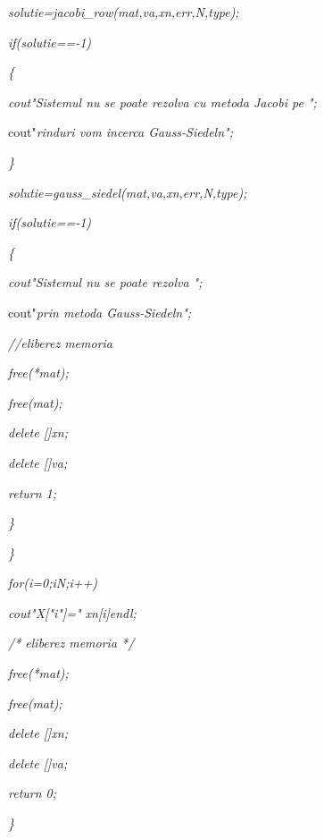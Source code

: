 \documentclass[a4paper,twoside]{book}
\begin{document}
\textit{\qquad \qquad solutie=jacobi\_row(mat,va,xn,err,N,type);}

\textit{\qquad \qquad if(solutie==-1)}

\textit{\qquad \qquad \{}

\textit{\qquad \qquad \qquad cout\TEXTsymbol{<}\TEXTsymbol{<}"Sistemul nu se
poate rezolva cu metoda Jacobi pe ";}

\qquad \qquad \qquad cout\TEXTsymbol{<}\TEXTsymbol{<}"\textit{rinduri vom
incerca Gauss-Siedel\TEXTsymbol{\backslash}n";}

\textit{\qquad \qquad \}}

\textit{\qquad \qquad solutie=gauss\_siedel(mat,va,xn,err,N,type);}

\textit{\qquad \qquad if(solutie==-1)}

\textit{\qquad \qquad \{}

\textit{\qquad \qquad \qquad cout\TEXTsymbol{<}\TEXTsymbol{<}"Sistemul nu se
poate rezolva ";}

\qquad \qquad \qquad cout\TEXTsymbol{<}\TEXTsymbol{<}"\textit{prin metoda
Gauss-Siedel\TEXTsymbol{\backslash}n";}

\textit{\qquad \qquad \qquad //eliberez memoria}

\textit{\qquad \qquad \qquad free(*mat);}

\textit{\qquad \qquad \qquad free(mat);}

\textit{\qquad \qquad \qquad delete []xn;}

\textit{\qquad \qquad \qquad delete []va;}

\textit{\qquad \qquad \qquad return 1;}

\textit{\qquad \qquad \}\qquad }

\textit{\qquad \}}

\textit{\qquad for(i=0;i\TEXTsymbol{<}N;i++)}

\textit{\qquad \qquad \qquad cout\TEXTsymbol{<}\TEXTsymbol{<}"X["\TEXTsymbol{%
<}\TEXTsymbol{<}i\TEXTsymbol{<}\TEXTsymbol{<}"]="\TEXTsymbol{<}\TEXTsymbol{<}%
xn[i]\TEXTsymbol{<}\TEXTsymbol{<}endl;}

\textit{\qquad /* eliberez memoria */}

\textit{\qquad free(*mat);}

\textit{\qquad free(mat);}

\textit{\qquad delete []xn;}

\textit{\qquad delete []va;}

\textit{\qquad return 0;}

\textit{\}}
\end{document}
